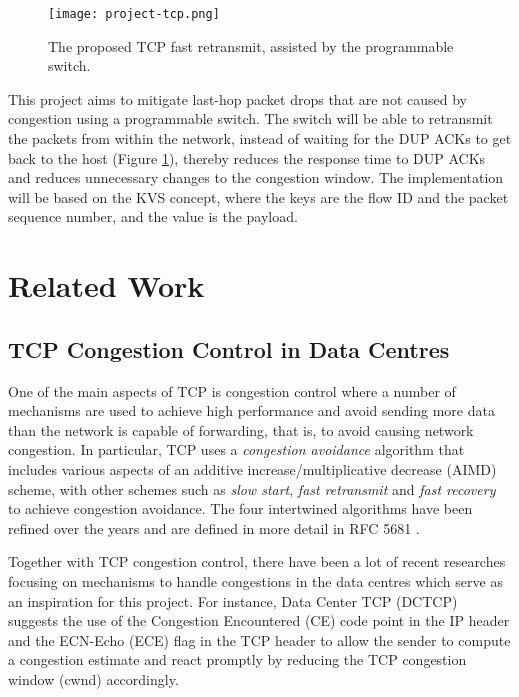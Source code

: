 \begin{figure}[h]
	\centering
	\texttt{[image: project-tcp.png]}
	\caption{The proposed TCP fast retransmit, assisted by the programmable switch.}
	\label{fig:project-tcp}
\end{figure}
 
This project aims to mitigate last-hop packet drops that are not caused by congestion using a programmable switch. The switch will be able to retransmit the packets from within the network, instead of waiting for the DUP ACKs to get back to the host (Figure \ref{fig:project-tcp}), thereby reduces the response time to DUP ACKs and reduces unnecessary changes to the congestion window. The implementation will be based on the KVS concept, where the keys are the flow ID and the packet sequence number, and the value is the payload.

\section{Related Work}
\label{sec:relate}
\subsection{TCP Congestion Control in Data Centres}
One of the main aspects of TCP is congestion control \cite{rfc2001} where a number of mechanisms are used to achieve high performance and avoid sending more data than the network is capable of forwarding, that is, to avoid causing network congestion. In particular, TCP uses a \textit{congestion avoidance} algorithm that includes various aspects of an additive increase/multiplicative decrease (AIMD) scheme, with other schemes such as \textit{slow start}, \textit{fast retransmit} and \textit{fast recovery} to achieve congestion avoidance. The four intertwined algorithms have been refined over the years and are defined in more detail in RFC 5681 \cite{rfc5681}.

Together with TCP congestion control, there have been a lot of recent researches focusing on mechanisms to handle congestions in the data centres \cite{ecn, dctcp, dcqcn, conga, alizadehattar_et_al:DR:2016:6760} which serve as an inspiration for this project. For instance, Data Center TCP (DCTCP) \cite{dctcp} suggests the use of the Congestion Encountered (CE) code point in the IP header and the ECN-Echo (ECE) flag in the TCP header to allow the sender to compute a congestion estimate and react promptly by reducing the TCP congestion window (cwnd) accordingly.

